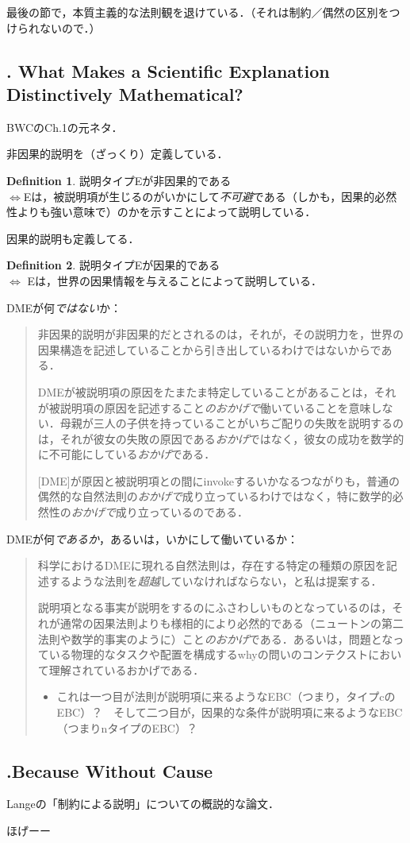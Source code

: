 \documentclass[dvipdfmx,twoside,11pt,uplatex]{jsarticle}
\theoremstyle{definition}
\newtheorem{dfn}{Definition}
\begin{document}
最後の節で，本質主義的な法則観を退けている．（それは制約／偶然の区別をつけられないので．）

\subsection{\cite{Lange2013a}. What Makes a Scientific Explanation Distinctively Mathematical?}
BWCのCh.1の元ネタ．

非因果的説明を（ざっくり）定義している\citep[487,491]{Lange2013a}．
\begin{dfn}
    説明タイプEが非因果的である\\
    $\Longleftrightarrow$Eは，被説明項が生じるのがいかにして\emph{不可避}である（しかも，因果的必然性よりも強い意味で）のかを示すことによって説明している．
\end{dfn}
因果的説明も定義してる\citep[493]{Lange2013a}．
\begin{dfn}
    説明タイプEが因果的である\\
    $\Longleftrightarrow$ Eは，世界の因果情報を与えることによって説明している．
\end{dfn}

DMEが何\emph{ではない}か：
\begin{quote}
非因果的説明が非因果的だとされるのは，それが，その説明力を，世界の因果構造を記述していることから引き出しているわけではないからである\citep[495]{Lange2013a}．

DMEが被説明項の原因をたまたま特定していることがあることは，それが被説明項の原因を記述すること\emph{のおかげで}働いていることを意味しない．母親が三人の子供を持っていることがいちご配りの失敗を説明するのは，それが彼女の失敗の原因である\emph{おかげ}ではなく，彼女の成功を数学的に不可能にしている\emph{おかげ}である\citep[496]{Lange2013a}．

[DME]が原因と被説明項との間にinvokeするいかなるつながりも，普通の偶然的な自然法則の\emph{おかげで}成り立っているわけではなく，特に数学的必然性の\emph{おかげで}成り立っているのである．\citep[496--7]{Lange2013a}
\end{quote}

DMEが何\emph{であるか}，あるいは，いかにして働いているか：
\begin{quote}
    科学におけるDMEに現れる自然法則は，存在する特定の種類の原因を記述するような法則を\emph{超越}していなければならない，と私は提案する．\citep[505]{Lange2013a}

    説明項となる事実が説明をするのにふさわしいものとなっているのは，それが通常の因果法則よりも様相的により必然的である（ニュートンの第二法則や数学的事実のように）こと\emph{のおかげ}である．あるいは，問題となっている物理的なタスクや配置を構成するwhyの問いのコンテクストにおいて理解されているおかげである．
    \begin{itemize}
        \item これは一つ目が法則が説明項に来るようなEBC（つまり，タイプcのEBC）？　そして二つ目が，因果的な条件が説明項に来るようなEBC（つまりnタイプのEBC）？
    \end{itemize}
\end{quote}

\subsection{\cite{Lange2018b}.Because Without Cause}
Langeの「制約による説明」についての概説的な論文．

ほげーー



\end{document}
